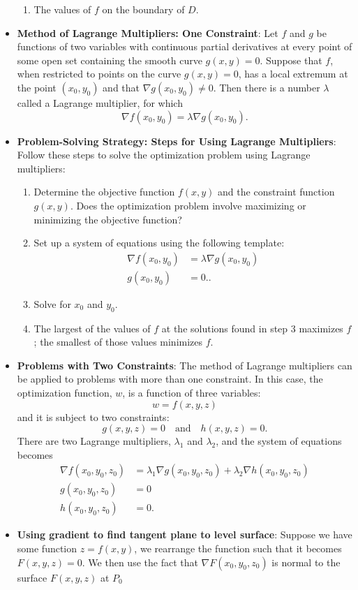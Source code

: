 \documentclass{report}
\begin{document}
\begin{itemize}
\begin{enumerate}
            \item The values of $f$ on the boundary of $D$.
        \end{enumerate}
    \item \textbf{Method of Lagrange Multipliers: One Constraint}:
        Let $f$ and $g$ be functions of two variables with continuous partial derivatives at every point of some open set containing the smooth curve $g(x,y)=0$. Suppose that $f$, when restricted to points on the curve $g(x,y)=0$, has a local extremum at the point $(x_0,y_0)$ and that $\nabla g(x_0,y_0) \neq 0$. Then there is a number $\lambda$ called a Lagrange multiplier, for which
        \[
            \nabla f(x_0,y_0) = \lambda \nabla g(x_0,y_0).
        \]
    \item \textbf{Problem-Solving Strategy: Steps for Using Lagrange Multipliers}:
        Follow these steps to solve the optimization problem using Lagrange multipliers:
        \begin{enumerate}
            \item Determine the objective function $f(x,y)$ and the constraint function $g(x,y)$. Does the optimization problem involve maximizing or minimizing the objective function?
            \item Set up a system of equations using the following template:
                \begin{align*}
                    \nabla f(x_0,y_0) &= \lambda \nabla g(x_0,y_0)  \\
                    g(x_0,y_0) &= 0.
                .\end{align*}
            \item Solve for $x_0$ and $y_0$.
            \item The largest of the values of $f$ at the solutions found in step 3 maximizes $f$; the smallest of those values minimizes $f$.
        \end{enumerate}
    \item \textbf{Problems with Two Constraints}:
        The method of Lagrange multipliers can be applied to problems with more than one constraint. In this case, the optimization function, $w$, is a function of three variables:
        \[
            w = f(x, y, z)
        \]
        and it is subject to two constraints:
        \[
            g(x, y, z) = 0 \quad \text{and} \quad h(x, y, z) = 0.
        \]
        There are two Lagrange multipliers, $\lambda_1$ and $\lambda_2$, and the system of equations becomes
        \begin{align*}
            \nabla f(x_0, y_0, z_0) &= \lambda_1 \nabla g(x_0, y_0, z_0) + \lambda_2 \nabla h(x_0, y_0, z_0) \\
            g(x_0, y_0, z_0) &= 0 \\
            h(x_0, y_0, z_0) &= 0
        .\end{align*}
    \item \textbf{Using gradient to find tangent plane to level surface}: Suppose we have some function $z = f(x,y)$, we rearrange the function such that it becomes $F(x,y,z) = 0$. We then use the fact that $\nabla F(x_{0}, y_{0}, z_{0}) $ is normal to the surface $F(x,y,z)$ at $P_{0} $ 
    \end{itemize}
\end{document}
